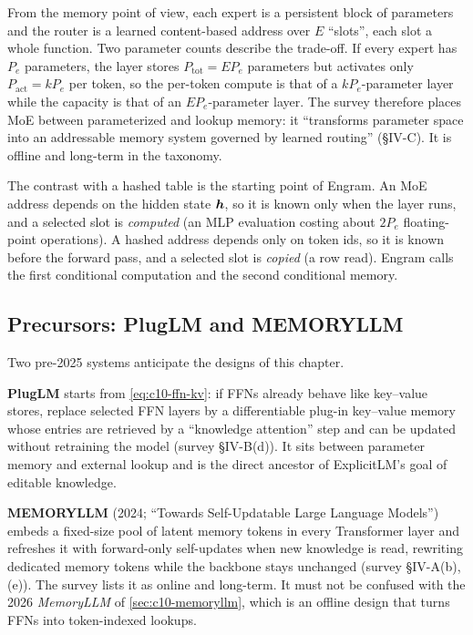 From the memory point of view, each expert is a persistent block of parameters and the router is
a learned content-based address over $E$ ``slots'', each slot a whole function. Two parameter
counts describe the trade-off. If every expert has $P_e$ parameters, the layer stores
$P_{\mathrm{tot}} = E P_e$ parameters but activates only $P_{\mathrm{act}} = k P_e$ per token, so
the per-token compute is that of a $k P_e$-parameter layer while the capacity is that of an
$E P_e$-parameter layer. The survey therefore places MoE between parameterized and lookup memory:
it ``transforms parameter space into an addressable memory system governed by learned routing''
(\S IV-C). It is offline and long-term in the taxonomy.

The contrast with a hashed table is the starting point of Engram. An MoE address depends on the
hidden state $\bm{h}$, so it is known only when the layer runs, and a selected slot is \emph{computed}
(an MLP evaluation costing about $2 P_e$ floating-point operations). A hashed address depends only
on token ids, so it is known before the forward pass, and a selected slot is \emph{copied} (a row
read). Engram calls the first conditional computation and the second conditional memory.

\subsection{Precursors: PlugLM and MEMORYLLM}\label{sec:c10-precursors}

Two pre-2025 systems anticipate the designs of this chapter.

\textbf{PlugLM} \citep{cheng2023pluglm} starts from \cref{eq:c10-ffn-kv}: if FFNs already behave
like key--value stores, replace selected FFN layers by a differentiable plug-in key--value memory
whose entries are retrieved by a ``knowledge attention'' step and can be updated without retraining
the model (survey \S IV-B(d)). It sits between parameter memory and external lookup and is the
direct ancestor of ExplicitLM's goal of editable knowledge.

\textbf{MEMORYLLM} \citep{wang2024memoryllm} (2024; ``Towards Self-Updatable Large Language
Models'') embeds a fixed-size pool of latent memory tokens in every Transformer layer and refreshes
it with forward-only self-updates when new knowledge is read, rewriting dedicated memory tokens
while the backbone stays unchanged (survey \S IV-A(b), (e)). The survey lists it as online and
long-term. It must not be confused with the 2026 \emph{MemoryLLM} of \cref{sec:c10-memoryllm},
which is an offline design that turns FFNs into token-indexed lookups.

